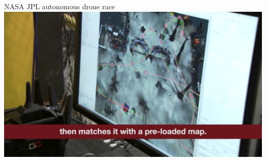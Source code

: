 \documentclass[aspectratio=169]{beamer}
\begin{document}
\begin{frame}{NASA JPL autonomous drone race}
        	\centering
            \href{run:./videos/NasaAutoDrone.mp4?autostart}
            {\includegraphics[width=\linewidth]{images/nasa.png}}
\end{frame}
\end{document}
